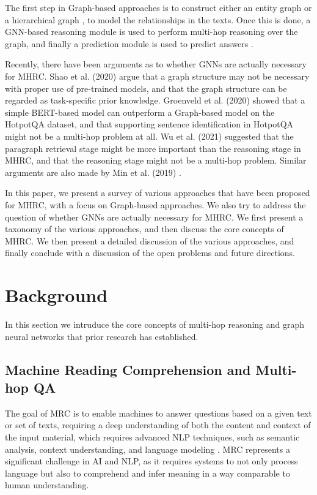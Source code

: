 \documentclass[sigplan,screen]{acmart}
\begin{document}

The first step in Graph-based approaches is to construct either an entity graph \cite{RN81} \cite{RN117} \cite{RN122} \cite{RN141} \cite{RN91}
 \cite{RN130} or a hierarchical graph \cite{RN124} \cite{RN119} \cite{RN130}, to model the relationships in the texts. Once this is done, a 
GNN-based reasoning module is used to perform multi-hop reasoning over the graph, and finally a prediction module is used to predict answers 
\cite{RN23}.

Recently, there have been arguments as to whether GNNs are actually necessary for MHRC. Shao et al. (2020) \cite{RN127} argue that 
a graph structure may not be necessary with proper use of pre-trained models, and that the graph structure can be regarded as task-specific 
prior knowledge. Groenveld et al. (2020) \cite{RN126} showed that a simple BERT-based model can outperform a Graph-based model on the HotpotQA 
dataset, and that supporting sentence identification in HotpotQA might not be a multi-hop problem at all. Wu et al. (2021) \cite{RN106} 
suggested that the paragraph retrieval stage might be more important than the reasoning stage in MHRC, and that the reasoning stage might not 
be a multi-hop problem. Similar arguments are also made by Min et al. (2019) \cite{RN150}.

In this paper, we present a survey of various approaches that have been proposed for MHRC, with a focus on Graph-based approaches. We also 
try to address the question of whether GNNs are actually necessary for MHRC. We first present a taxonomy of the various approaches, and then 
discuss the core concepts of MHRC. We then present a detailed discussion of the various approaches, and finally conclude with a discussion of 
the open problems and future directions.

\section{Background}
In this section we intruduce the core concepts of multi-hop reasoning and graph neural networks that prior research has established.  

\subsection{Machine Reading Comprehension and Multi-hop QA}
The goal of MRC is to enable machines to answer questions based on a given text or set of texts, requiring a deep understanding of both the content and context of the input material, which 
requires advanced NLP techniques, such as semantic analysis, context understanding, and language modeling \cite{RN208}. MRC represents a significant challenge in AI and NLP, as it requires systems to not only process language but also to comprehend and infer meaning in a way comparable to human understanding.
\end{document}
